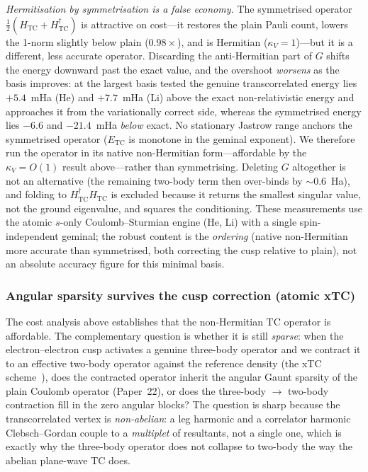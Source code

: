 \documentclass[aps,pra,twocolumn,superscriptaddress,longbibliography]{revtex4-2}
\begin{document}
\emph{Hermitisation by symmetrisation is a false economy.}  The
symmetrised operator
$\tfrac12(H_{\mathrm{TC}} + H_{\mathrm{TC}}^\dagger)$ is attractive on
cost---it restores the plain Pauli count, lowers the 1-norm slightly
below plain ($0.98\times$), and is Hermitian ($\kappa_V = 1$)---but it is
a different, less accurate operator.  Discarding the anti-Hermitian part
of $G$ shifts the energy downward past the exact value, and the
overshoot \emph{worsens} as the basis improves: at the largest basis
tested the genuine transcorrelated energy lies $+5.4$~mHa (He) and
$+7.7$~mHa (Li) above the exact non-relativistic energy and approaches it
from the variationally correct side, whereas the symmetrised energy lies
$-6.6$ and $-21.4$~mHa \emph{below} exact.  No stationary Jastrow range
anchors the symmetrised operator ($E_{\mathrm{TC}}$ is monotone in the
geminal exponent).  We therefore run the operator in its native
non-Hermitian form---affordable by the $\kappa_V = O(1)$ result
above---rather than symmetrising.  Deleting $G$ altogether is not an
alternative (the remaining two-body term then over-binds by
$\sim0.6$~Ha), and folding to
$H_{\mathrm{TC}}^\dagger H_{\mathrm{TC}}$ is excluded because it returns
the smallest singular value, not the ground eigenvalue, and squares the
conditioning.  These measurements use the atomic $s$-only
Coulomb--Sturmian engine (He, Li) with a single spin-independent
geminal; the robust content is the \emph{ordering} (native non-Hermitian
more accurate than symmetrised, both correcting the cusp relative to
plain), not an absolute accuracy figure for this minimal basis.

\subsubsection{Angular sparsity survives the cusp correction (atomic xTC)}
\label{sec:tc_atomic_sparsity}

The cost analysis above establishes that the non-Hermitian TC operator is
affordable.  The complementary question is whether it is still \emph{sparse}:
when the electron--electron cusp activates a genuine three-body operator and we
contract it to an effective two-body operator against the reference density (the
xTC scheme~\cite{christlmaier2023xtc}), does the contracted operator inherit the
angular Gaunt sparsity of the plain Coulomb operator (Paper~22), or does the
three-body $\to$ two-body contraction fill in the zero angular blocks?  The
question is sharp because the transcorrelated vertex is \emph{non-abelian}: a leg
harmonic and a correlator harmonic Clebsch--Gordan couple to a \emph{multiplet}
of resultants, not a single one, which is exactly why the three-body operator does
not collapse to two-body the way the abelian plane-wave TC does.
\end{document}
